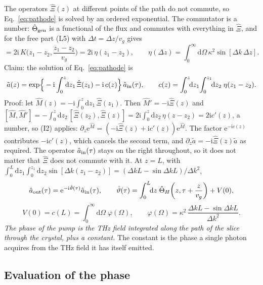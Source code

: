 \documentclass[aps,pra,onecolumn,notitlepage,11pt,amsmath,amssymb,nofootinbib]{revtex4-2}
\newcommand{\dd}{\mathrm{d}}
\newcommand{\ee}{\mathrm{e}}
\newcommand{\ii}{\mathrm{i}}
\begin{document}
The operators $\hat\Xi(z)$ at different points of the path do not commute, so
Eq.~\eqref{eq:pathode} is solved by an ordered exponential. The commutator is
a number: $\hat\Theta_{\rm gen}$ is a functional of the flux and commutes with
everything in $\hat\Xi$, and for the free part (L5) with
$\Delta t=\Delta z/v_g$ gives
\begin{equation}
[\hat\Xi(z_1),\hat\Xi(z_2)]=2\ii\,K\Big(z_1-z_2,\frac{z_1-z_2}{v_g}\Big)
=2\ii\,\eta(z_1-z_2),\qquad
\eta(\Delta z)=\int_0^\infty\!\!\dd\Omega\,\kappa^2\sin[\Delta k\,\Delta z].
\end{equation}
Claim: the solution of Eq.~\eqref{eq:pathode} is
\begin{equation}
\tilde a(z)=\exp\!\Big\{-\ii\int_0^z\!\!\dd z_1\,\hat\Xi(z_1)-\ii\,c(z)\Big\}\,\hat a_{\rm in}(\tau),
\qquad c(z)=\int_0^z\!\!\dd z_1\!\int_0^{z_1}\!\!\dd z_2\;\eta(z_1-z_2).
\end{equation}
Proof: let $\hat M(z)=-\ii\int_0^z\dd z_1\,\hat\Xi(z_1)$. Then
$\hat M'=-\ii\hat\Xi(z)$ and
$[\hat M,\hat M']=-\int_0^z\dd z_2\,[\hat\Xi(z_2),\hat\Xi(z)]
=2\ii\int_0^z\dd z_2\,\eta(z-z_2)=2\ii c'(z)$, a number, so (I2) applies:
$\partial_z\ee^{\hat M}=(-\ii\hat\Xi(z)+\ii c'(z))\ee^{\hat M}$. The factor
$\ee^{-\ii c(z)}$ contributes $-\ii c'(z)$, which cancels the second term, and
$\partial_z\tilde a=-\ii\hat\Xi(z)\tilde a$ as required. The operator
$\hat a_{\rm in}(\tau)$ stays on the right throughout, so it does not matter
that $\hat\Xi$ does not commute with it. At $z=L$, with
$\int_0^L\dd z_1\int_0^{z_1}\dd z_2\sin[\Delta k(z_1-z_2)]
=(\Delta kL-\sin\Delta kL)/\Delta k^2$,
\begin{equation}
\hat a_{\rm out}(\tau)=\ee^{-\ii\hat\vartheta(\tau)}\hat a_{\rm in}(\tau),\qquad
\hat\vartheta(\tau)=\int_0^L\!\!\dd z\;\hat\Theta_H\!\left(z,\tau+\frac{z}{v_g}\right)+V(0),
\label{eq:path}
\end{equation}
\begin{equation}
V(0)=c(L)=\int_0^\infty\!\!\dd\Omega\;\varphi(\Omega),\qquad
\varphi(\Omega)=\kappa^2\,\frac{\Delta kL-\sin\Delta kL}{\Delta k^2}.
\label{eq:varphi}
\end{equation}
\emph{The phase of the pump is the THz field integrated along the path of the
slice through the crystal, plus a constant.} The constant is the phase a
single photon acquires from the THz field it has itself emitted.

\subsection{Evaluation of the phase}
\label{sec:pumpeval}
\end{document}
